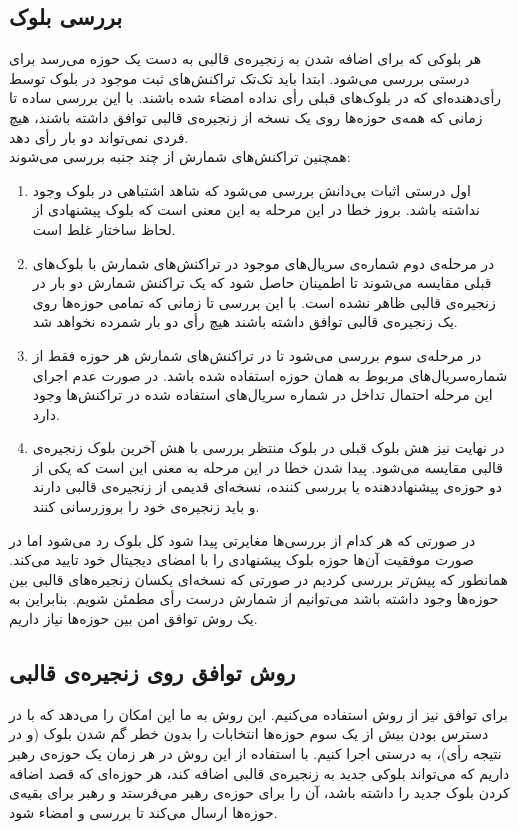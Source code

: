\subsection{بررسی بلوک}
هر بلوکی که برای اضافه شدن به زنجیره‌ی قالبی به دست یک حوزه می‌رسد برای درستی بررسی می‌شود. ابتدا باید تک‌‌تک تراکنش‌های ثبت موجود در بلوک توسط رأی‌دهنده‌‌ای که در بلوک‌های قبلی رأی‌ نداده امضاء شده باشند. با این بررسی ساده تا زمانی که همه‌ی حوزه‌ها روی یک نسخه از زنجیره‌ی قالبی توافق داشته باشند، هیچ فردی نمی‌تواند دو بار رأی ‌دهد.
\\
همچنین تراکنش‌های شمارش از چند جنبه بررسی می‌شوند:
	\begin{enumerate}
		\item 
		اول درستی اثبات‌ بی‌دانش بررسی می‌شود که شاهد اشتباهی در بلوک وجود نداشته باشد. بروز خطا در این مرحله به این معنی است که بلوک پیشنهادی از لحاظ ساختار غلط است.
		\item 
		در مرحله‌ی دوم شماره‌ی سریال‌های موجود در تراکنش‌های شمارش با بلوک‌های قبلی مقایسه می‌شوند تا اطمینان حاصل شود که یک تراکنش شمارش دو بار در زنجیره‌ی قالبی ظاهر نشده است. با این بررسی تا زمانی که تمامی حوزه‌ها روی یک زنجیره‌ی قالبی توافق داشته ‌باشند هیچ رأی دو بار شمرده نخواهد شد.
		\item 
		در مرحله‌ی سوم بررسی می‌شود تا در تراکنش‌های شمارش هر حوزه فقط از شماره‌سریال‌های مربوط به همان حوزه استفاده شده باشد. در صورت عدم اجرای این مرحله احتمال تداخل در شماره سریال‌های استفاده شده در تراکنش‌ها وجود دارد.
		\item 
		در نهایت نیز هش بلوک قبلی در بلوک منتظر بررسی با هش آخرین بلوک زنجیره‌ی قالبی مقایسه می‌شود. پیدا شدن خطا در این مرحله به معنی این است که یکی از دو حوزه‌ی پیشنهاددهنده یا بررسی کننده، نسخه‌ای قدیمی از زنجیره‌ی قالبی دارند و باید زنجیره‌ی خود را بروزرسانی کنند.
		
	\end{enumerate}

\par
 در صورتی که هر کدام از بررسی‌ها مغایرتی پیدا شود کل بلوک رد می‌شود اما در صورت موفقیت آن‌ها حوزه بلوک پیشنهادی را با امضای دیجیتال خود تایید می‌کند. همانطور که پیش‌تر بررسی کردیم در صورتی که نسخه‌ای یکسان زنجیره‌های قالبی بین حوزه‌ها وجود داشته باشد می‌توانیم از شمارش درست رأی مطمئن شویم. بنابراین به یک روش توافق امن بین حوزه‌ها نیاز داریم.


\subsection{روش توافق روی زنجیره‌ی قالبی}
برای توافق نیز از روش  استفاده می‌کنیم. این روش به ما این امکان را می‌دهد که با در دسترس بودن بیش از یک سوم حوزه‌ها انتخابات را بدون خطر گم شدن بلوک (و در نتیجه رأی)، به درستی اجرا کنیم. با استفاده از این روش در هر زمان یک حوزه‌ی رهبر داریم که می‌تواند بلوکی جدید به زنجیره‌ی قالبی اضافه کند، هر حوزه‌ای که قصد اضافه کردن بلوک جدید را داشته باشد، آن را برای حوزه‌ی رهبر می‌فرستد و رهبر برای بقیه‌ی حوزه‌ها ارسال می‌کند تا بررسی و امضاء شود. 

